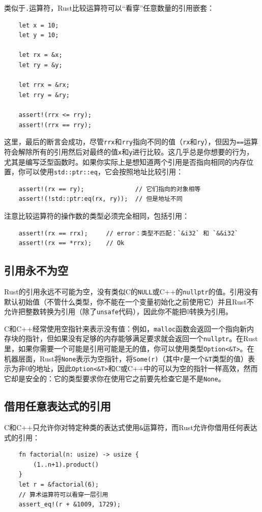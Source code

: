 类似于\texttt{.}运算符，Rust比较运算符可以“看穿”任意数量的引用嵌套：
\begin{verbatim}
    let x = 10;
    let y = 10;

    let rx = &x;
    let ry = &y;

    let rrx = &rx;
    let rry = &ry;

    assert!(rrx <= rry);
    assert!(rrx == rry);
\end{verbatim}

这里，最后的断言会成功，尽管\texttt{rrx}和\texttt{rry}指向不同的值（\texttt{rx}和\texttt{ry}），但因为\texttt{==}运算符会解除所有的引用然后对最终的值\texttt{x}和\texttt{y}进行比较。这几乎总是你想要的行为，尤其是编写泛型函数时。如果你实际上是想知道两个引用是否指向相同的内存位置，你可以使用\texttt{std::ptr::eq}，它会按照地址比较引用：
\begin{verbatim}
    assert!(rx == ry);              // 它们指向的对象相等
    assert!(!std::ptr:eq(rx, ry));  // 但是地址不同
\end{verbatim}

注意比较运算符的操作数的类型必须完全相同，包括引用：
\begin{verbatim}
    assert!(rx == rrx);     // error：类型不匹配：`&i32` 和 `&&i32`
    assert!(rx == *rrx);    // Ok
\end{verbatim}

\subsection{引用永不为空}
Rust的引用永远不可能为空，没有类似C的\texttt{NULL}或C++的\texttt{nullptr}的值。引用没有默认初始值（不管什么类型，你不能在一个变量初始化之前使用它）并且Rust不允许把整数转换为引用（除了\texttt{unsafe}代码），因此你不能把0转换为引用。

C和C++经常使用空指针来表示没有值：例如，\texttt{malloc}函数会返回一个指向新内存块的指针，但如果没有足够的内存能够满足要求就会返回一个\texttt{nullptr}。在Rust里，如果你需要一个可能是引用可能是无的值，你可以使用类型\texttt{Option<\&T>}。在机器层面，Rust将\texttt{None}表示为空指针，将\texttt{Some(r)}（其中\texttt{r}是一个\texttt{\&T}类型的值）表示为非0的地址，因此\texttt{Option<\&T>}和C或C++中的可以为空的指针一样高效，然而它却是安全的：它的类型要求你在使用它之前要先检查它是不是\texttt{None}。

\subsection{借用任意表达式的引用}
C和C++只允许你对特定种类的表达式使用\texttt{\&}运算符，而Rust允许你借用任何表达式的引用：
\begin{verbatim}
    fn factorial(n: usize) -> usize {
        (1..n+1).product()
    }
    let r = &factorial(6);
    // 算术运算符可以看穿一层引用
    assert_eq!(r + &1009, 1729);
\end{verbatim}

